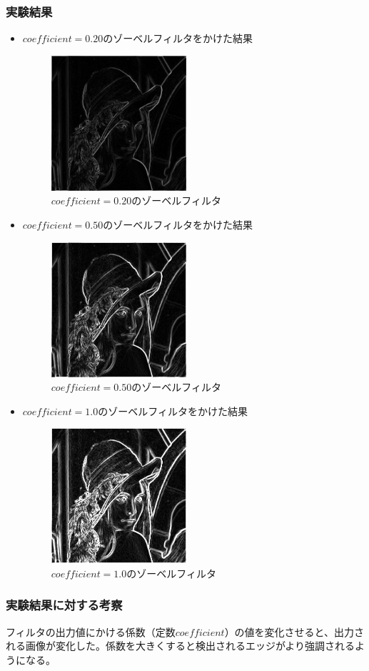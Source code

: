 \documentclass[a4paper,10pt,uplatex,dvipdfmx]{jsarticle}
\begin{document}
\subsubsection{実験結果}
\begin{itemize}
  \item $coefficient=0.20$のゾーベルフィルタをかけた結果
    \begin{figure}[H]
      \centering
      \includegraphics[width=5cm]{../src/img/output_sobel02.png}
      \caption{$coefficient=0.20$のゾーベルフィルタ}
    \end{figure} 
  \item $coefficient=0.50$のゾーベルフィルタをかけた結果
    \begin{figure}[H]
      \centering
      \includegraphics[width=5cm]{../src/img/output_sobel.png}
      \caption{$coefficient=0.50$のゾーベルフィルタ}
    \end{figure} 
  \item $coefficient=1.0$のゾーベルフィルタをかけた結果
    \begin{figure}[H]
      \centering
      \includegraphics[width=5cm]{../src/img/output_sobel10.png}
      \caption{$coefficient=1.0$のゾーベルフィルタ}
    \end{figure} 
\end{itemize}

\subsubsection{実験結果に対する考察}
フィルタの出力値にかける係数（定数$coefficient$）の値を変化させると、出力される画像が変化した。係数を大きくすると検出されるエッジがより強調されるようになる。
\end{document}
